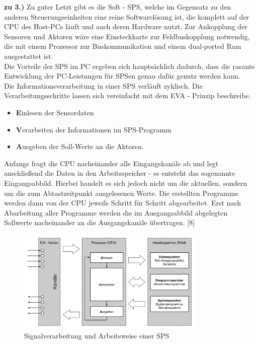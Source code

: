 	\textbf{zu 3.)} Zu guter Letzt gibt es die Soft - SPS, welche im Gegensatz zu den anderen Steuerungseinheiten eine reine Softwarelösung ist, die komplett auf der CPU des Host-PCs läuft und auch deren Hardware nutzt. Zur Ankopplung der Sensoren und Aktoren wäre eine Einsteckkarte zur Feldbuskopplung notwendig, die mit einem Prozessor zur Buskommunikation und einem dual-ported Ram ausgestattet ist.\\
	
	Die Vorteile der SPS im PC ergeben sich hauptsächlich dadurch, dass die rasante Entwicklung der PC-Leistungen für SPSen genau dafür genutz werden kann.\\
	
	Die Informationsverarbeitung in einer SPS verläuft zyklisch. Die Verarbeitungsschritte lassen sich vereinfacht mit dem EVA - Prinzip beschreibe.
	
	\begin{itemize}
		\item \textbf{E}inlesen der Sensordaten
		\item \textbf{V}erarbeiten der Informationen im SPS-Programm
		\item \textbf{A}usgeben der Soll-Werte an die Aktoren.
	\end{itemize}
	
	Anfangs fragt die CPU nacheinander alle Eingangskanäle ab und legt anschließend die Daten in den Arbeitsspeicher - es entsteht das sogenannte \glqq Eingangsabbild\grqq. Hierbei handelt es sich jedoch nicht um die aktuellen, sondern um die zum Abtastzeitpunkt ausgelesenen Werte. Die erstellten Programme werden dann von der CPU jeweils Schritt für Schritt abgearbeitet. Erst nach Abarbeitung aller Programme werden die im Ausgangsabbild abgelegten Sollwerte nacheinander an die Ausgangskanäle übertragen. [8]\\ 
	
	\begin{figure}[h!]
  		\centering
    	\includegraphics[width=0.8\textwidth]{graphics/stateoftheart/Signalverarbeitung_Selfmade.png}
  		\caption{Signalverarbeitung und Arbeitsweise einer SPS}
	\end{figure}
	

